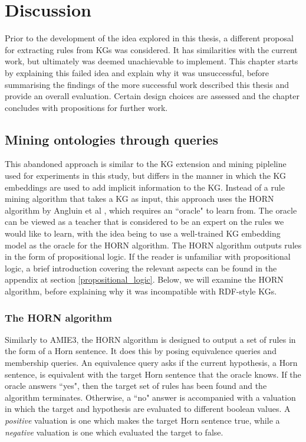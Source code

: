 \chapter{Discussion}
Prior to the development of the idea explored in this thesis, a different proposal for extracting rules from KGs was considered. It has similarities with the current work, but ultimately was deemed unachievable to implement. This chapter starts by explaining this failed idea and explain why it was unsuccessful, before summarising the findings of the more successful work described this thesis and provide an overall evaluation. Certain design choices are assessed and the chapter concludes with propositions for further work.

\section{Mining ontologies through queries}
This abandoned approach is similar to the KG extension and mining pipleline used for experiments in this study, but differs in the manner in which the KG embeddings are used to add implicit information to the KG. Instead of a rule mining algorithm that takes a KG as input, this approach uses the HORN algorithm by Angluin et al \cite{DBLP:journals/ml/AngluinFP92}, which requires an ``oracle" to learn from. The oracle can be viewed as a teacher that is considered to be an expert on the rules we would like to learn, with the idea being to use a well-trained KG embedding model as the oracle for the HORN algorithm. The HORN algorithm outputs rules in the form of propositional logic. If the reader is unfamiliar with propositional logic, a brief introduction covering the relevant aspects can be found in the appendix at section \ref{propositional_logic}. Below, we will examine the HORN algorithm, before explaining why it was incompatible with RDF-style KGs.

\subsection{The HORN algorithm}
Similarly to AMIE3, the HORN algorithm is designed to output a set of rules in the form of a Horn sentence. It does this by posing equivalence queries and membership queries. An equivalence query asks if the current hypothesis, a Horn sentence, is equivalent with the target Horn sentence that the oracle knows. If the oracle answers ``yes", then the target set of rules has been found and the algorithm terminates. Otherwise, a ``no" answer is accompanied with a valuation in which the target and hypothesis are evaluated to different boolean values. A \textit{positive} valuation is one which makes the target Horn sentence true, while a \textit{negative} valuation is one which evaluated the target to false. %

